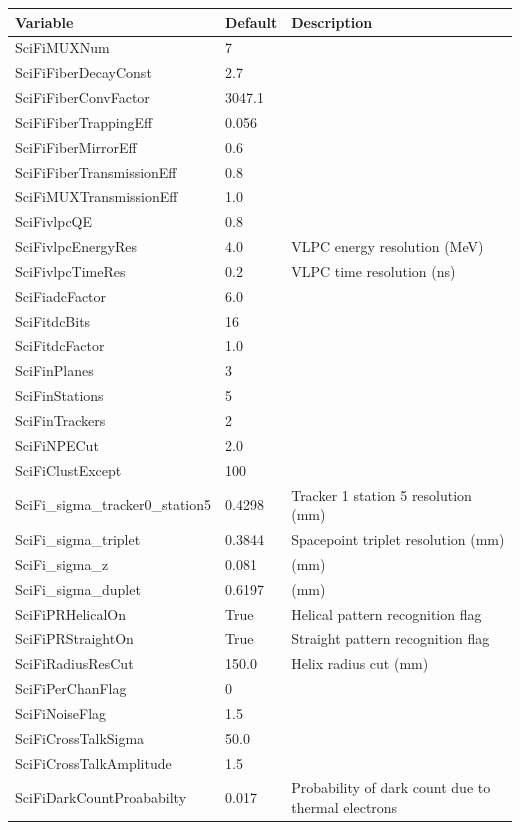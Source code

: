 \renewcommand{\arraystretch}{1.1}
\begin{tabular}{| l | l | p{8cm} |}
  \hline                       
  \textbf{Variable} & \textbf{Default}& \textbf{Description}  \\
  \hline
  SciFiMUXNum & 7 & \\
  SciFiFiberDecayConst & 2.7 & \\
  SciFiFiberConvFactor & 3047.1 & \\
  SciFiFiberTrappingEff & 0.056 & \\
  SciFiFiberMirrorEff & 0.6 & \\
  SciFiFiberTransmissionEff & 0.8 & \\
  SciFiMUXTransmissionEff & 1.0 & \\
  SciFivlpcQE & 0.8 & \\
  SciFivlpcEnergyRes & 4.0 & VLPC energy resolution (MeV) \\
  SciFivlpcTimeRes & 0.2 & VLPC time resolution (ns) \\
  SciFiadcFactor & 6.0 & \\
  SciFitdcBits & 16 & \\
  SciFitdcFactor & 1.0 & \\
  SciFinPlanes & 3 & \\
  SciFinStations & 5 & \\
  SciFinTrackers & 2 & \\
  SciFiNPECut & 2.0 & \\
  SciFiClustExcept & 100 & \\
  SciFi\_sigma\_tracker0\_station5 & 0.4298 & Tracker 1 station 5 resolution (mm) \\
  SciFi\_sigma\_triplet & 0.3844 & Spacepoint triplet resolution (mm) \\
  SciFi\_sigma\_z & 0.081 & (mm) \\
  SciFi\_sigma\_duplet & 0.6197 & (mm) \\
  SciFiPRHelicalOn & True & Helical pattern recognition flag \\
  SciFiPRStraightOn  & True & Straight pattern recognition flag \\
  SciFiRadiusResCut & 150.0 & Helix radius cut (mm) \\
  SciFiPerChanFlag & 0 & \\
  SciFiNoiseFlag & 1.5 & \\
  SciFiCrossTalkSigma & 50.0 & \\
  SciFiCrossTalkAmplitude & 1.5 & \\
  SciFiDarkCountProababilty & 0.017 & Probability of dark count due to thermal electrons \\

\end{tabular}
